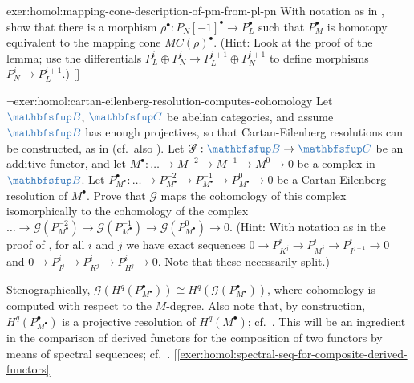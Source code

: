 \begin{exer}{\exerused{}}{exer:homol:mapping-cone-description-of-pm-from-pl-pn}
  With notation as in , show that there is a
  morphism $\rho^\bullet : P_N[-1]^\bullet \to P_L^\bullet$ such that
  $P_M^\bullet$ is homotopy equivalent to the mapping cone
  $MC(\rho)^\bullet$. (Hint: Look at the proof of the lemma; use the
  differentials $P_L^i \oplus P_N^i \to P_L^{i+1} \oplus P_N^{i+1}$ to
  define morphisms $P_N^i \to P_L^{i+1}$.)
  []
\end{exer}
\begin{exer}{$\lnot$}{exer:homol:cartan-eilenberg-resolution-computes-cohomology}
  Let $\categ{B}$, $\categ{C}$ be abelian categories, and assume
  $\categ{B}$ has enough projectives, so that Cartan-Eilenberg
  resolutions can be constructed, as in  (cf.\
  also ). Let
  $\mathscr{G} : \categ{B} \to \categ{C}$ be an additive functor, and
  let $M^\bullet : \dots \to M^{-2} \to M^{-1} \to M^0 \to 0$ be a
  complex in $\categ{B}$. Let
  $P_{M^\bullet}^\bullet : \dots \to P_{M^\bullet}^{-2} \to
  P_{M^\bullet}^{-1} \to P_{M^\bullet}^0 \to 0$ be a Cartan-Eilenberg
  resolution of $M^\bullet$. Prove that $\mathscr{G}$ maps the
  cohomology of this complex isomorphically to the cohomology of the
  complex
  $\dots \to \mathscr{G}(P_{M^\bullet}^{-2}) \to
  \mathscr{G}(P_{M^\bullet}^{-1}) \to \mathscr{G}(P_{M^\bullet}^0) \to
  0$. (Hint: With notation as in the proof of ,
  for all $i$ and $j$ we have exact sequences
  $0 \to P_{K^j}^i \to P_{M^j}^i \to P_{I^{j+1}}^i \to 0$ and
  $0 \to P_{I^j}^i \to P_{K^j}^i \to P_{H^j}^i \to 0$. Note that these
  necessarily split.)

  Stenographically,
  $\mathscr{G}(H^q(P_{M^\bullet}^\bullet)) \cong
  H^q(\mathscr{G}(P_{M^\bullet}^\bullet))$, where cohomology is
  computed with respect to the $M$-degree. Also note that, by
  construction, $H^q(P_{M^\bullet}^\bullet)$ is a projective
  resolution of $H^q(M^\bullet)$; cf.\ . This
  will be an ingredient in the comparison of derived functors for the
  composition of two functors by means of spectral sequences; cf.\
  .
  [\ref{exer:homol:spectral-seq-for-composite-derived-functors}]
\end{exer}
